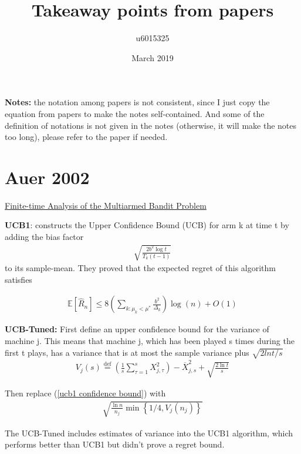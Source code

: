 \documentclass{article}
\title{Takeaway points from papers}
\author{u6015325 }
\date{March 2019}
\begin{document}
\maketitle

\textbf{Notes:} the notation among papers is not consistent, since I just copy the equation from papers to make the notes self-contained. And some of the definition of notations is not given in the notes (otherwise, it will make the notes too long), please refer to the paper if needed. 

\section{Auer 2002}
\href{https://homes.di.unimi.it/~cesabian/Pubblicazioni/ml-02.pdf}{Finite-time Analysis of the Multiarmed Bandit Problem} \cite{auer2002finite}

\textbf{UCB1}: constructs the Upper
Confidence Bound (UCB) for arm k at time t by adding the bias factor
\begin{align}
    \label{ucb1 confidence bound}
    \sqrt{\frac{2 b^{2} \log t}{T_{k}(t-1)}}
\end{align}
to its sample-mean. They proved that the expected regret of this algorithm satisfies

\begin{align}
    \label{ucb1 regret bound}
    \mathbb{E}\left[\hat{R}_{n}\right] \leq 8\left(\sum_{k : \mu_{k}<\mu^{*}} \frac{b^{2}}{\Delta_{k}}\right) \log (n)+O(1)
\end{align}

\textbf{UCB-Tuned:}
First define an upper confidence bound for the variance of machine j. This means that machine j, which has been played s times during the first t plays, has a variance that is at most the sample variance plus $\sqrt{2 lnt/s}$
\begin{align}
    V_{j}(s) \stackrel{\mathrm{def}}{=}\left(\frac{1}{s} \sum_{\tau=1}^{s} X_{j, \tau}^{2}\right)-\overline{X}_{j, s}^{2}+\sqrt{\frac{2 \ln t}{s}}
\end{align}

Then replace (\ref{ucb1 confidence bound}) with 
\begin{align}
    \sqrt{\frac{\ln n}{n_{j}} \min \left\{1 / 4, V_{j}\left(n_{j}\right)\right\}}
\end{align}

The UCB-Tuned includes estimates of variance into the UCB1 algorithm, which performs better than UCB1 but \cite{auer2002finite} didn't prove a regret bound.\\
\end{document}
